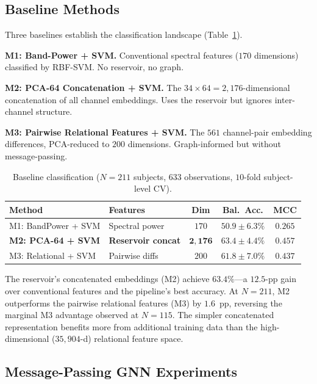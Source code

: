 \subsection{Baseline Methods}

Three baselines establish the classification landscape (Table~\ref{tab:baselines}).

\textbf{M1: Band-Power + SVM.} Conventional spectral features ($170$ dimensions) classified by RBF-SVM. No reservoir, no graph.

\textbf{M2: PCA-64 Concatenation + SVM.} The $34 \times 64 = 2{,}176$-dimensional concatenation of all channel embeddings. Uses the reservoir but ignores inter-channel structure.

\textbf{M3: Pairwise Relational Features + SVM.} The $561$ channel-pair embedding differences, PCA-reduced to $200$ dimensions. Graph-informed but without message-passing.

\begin{table}[t]
\centering
\caption{Baseline classification ($N = 211$ subjects, $633$ observations, $10$-fold subject-level CV).}
\label{tab:baselines}
\begin{tabular}{llccc}
\hline
\textbf{Method} & \textbf{Features} & \textbf{Dim} & \textbf{Bal.\ Acc.} & \textbf{MCC} \\
\hline
M1: BandPower + SVM & Spectral power & $170$ & $50.9 \pm 6.3\%$ & $0.265$ \\
\textbf{M2: PCA-64 + SVM} & \textbf{Reservoir concat} & $\mathbf{2{,}176}$ & $\mathbf{63.4 \pm 4.4\%}$ & $\mathbf{0.457}$ \\
M3: Relational + SVM & Pairwise diffs & $200$ & $61.8 \pm 7.0\%$ & $0.437$ \\
\hline
\end{tabular}
\end{table}

The reservoir's concatenated embeddings (M2) achieve $63.4\%$---a $12.5$-pp gain over conventional features and the pipeline's best accuracy. At $N = 211$, M2 outperforms the pairwise relational features (M3) by $1.6$~pp, reversing the marginal M3 advantage observed at $N = 115$. The simpler concatenated representation benefits more from additional training data than the high-dimensional ($35{,}904$-d) relational feature space.

\subsection{Message-Passing GNN Experiments}


